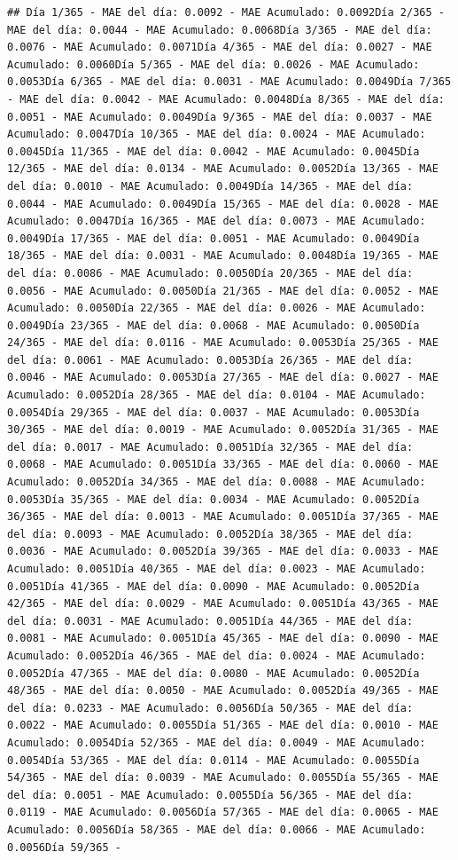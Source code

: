 \documentclass[
]{book}
\begin{document}
\begin{verbatim}
## Día 1/365 - MAE del día: 0.0092 - MAE Acumulado: 0.0092Día 2/365 - MAE del día: 0.0044 - MAE Acumulado: 0.0068Día 3/365 - MAE del día: 0.0076 - MAE Acumulado: 0.0071Día 4/365 - MAE del día: 0.0027 - MAE Acumulado: 0.0060Día 5/365 - MAE del día: 0.0026 - MAE Acumulado: 0.0053Día 6/365 - MAE del día: 0.0031 - MAE Acumulado: 0.0049Día 7/365 - MAE del día: 0.0042 - MAE Acumulado: 0.0048Día 8/365 - MAE del día: 0.0051 - MAE Acumulado: 0.0049Día 9/365 - MAE del día: 0.0037 - MAE Acumulado: 0.0047Día 10/365 - MAE del día: 0.0024 - MAE Acumulado: 0.0045Día 11/365 - MAE del día: 0.0042 - MAE Acumulado: 0.0045Día 12/365 - MAE del día: 0.0134 - MAE Acumulado: 0.0052Día 13/365 - MAE del día: 0.0010 - MAE Acumulado: 0.0049Día 14/365 - MAE del día: 0.0044 - MAE Acumulado: 0.0049Día 15/365 - MAE del día: 0.0028 - MAE Acumulado: 0.0047Día 16/365 - MAE del día: 0.0073 - MAE Acumulado: 0.0049Día 17/365 - MAE del día: 0.0051 - MAE Acumulado: 0.0049Día 18/365 - MAE del día: 0.0031 - MAE Acumulado: 0.0048Día 19/365 - MAE del día: 0.0086 - MAE Acumulado: 0.0050Día 20/365 - MAE del día: 0.0056 - MAE Acumulado: 0.0050Día 21/365 - MAE del día: 0.0052 - MAE Acumulado: 0.0050Día 22/365 - MAE del día: 0.0026 - MAE Acumulado: 0.0049Día 23/365 - MAE del día: 0.0068 - MAE Acumulado: 0.0050Día 24/365 - MAE del día: 0.0116 - MAE Acumulado: 0.0053Día 25/365 - MAE del día: 0.0061 - MAE Acumulado: 0.0053Día 26/365 - MAE del día: 0.0046 - MAE Acumulado: 0.0053Día 27/365 - MAE del día: 0.0027 - MAE Acumulado: 0.0052Día 28/365 - MAE del día: 0.0104 - MAE Acumulado: 0.0054Día 29/365 - MAE del día: 0.0037 - MAE Acumulado: 0.0053Día 30/365 - MAE del día: 0.0019 - MAE Acumulado: 0.0052Día 31/365 - MAE del día: 0.0017 - MAE Acumulado: 0.0051Día 32/365 - MAE del día: 0.0068 - MAE Acumulado: 0.0051Día 33/365 - MAE del día: 0.0060 - MAE Acumulado: 0.0052Día 34/365 - MAE del día: 0.0088 - MAE Acumulado: 0.0053Día 35/365 - MAE del día: 0.0034 - MAE Acumulado: 0.0052Día 36/365 - MAE del día: 0.0013 - MAE Acumulado: 0.0051Día 37/365 - MAE del día: 0.0093 - MAE Acumulado: 0.0052Día 38/365 - MAE del día: 0.0036 - MAE Acumulado: 0.0052Día 39/365 - MAE del día: 0.0033 - MAE Acumulado: 0.0051Día 40/365 - MAE del día: 0.0023 - MAE Acumulado: 0.0051Día 41/365 - MAE del día: 0.0090 - MAE Acumulado: 0.0052Día 42/365 - MAE del día: 0.0029 - MAE Acumulado: 0.0051Día 43/365 - MAE del día: 0.0031 - MAE Acumulado: 0.0051Día 44/365 - MAE del día: 0.0081 - MAE Acumulado: 0.0051Día 45/365 - MAE del día: 0.0090 - MAE Acumulado: 0.0052Día 46/365 - MAE del día: 0.0024 - MAE Acumulado: 0.0052Día 47/365 - MAE del día: 0.0080 - MAE Acumulado: 0.0052Día 48/365 - MAE del día: 0.0050 - MAE Acumulado: 0.0052Día 49/365 - MAE del día: 0.0233 - MAE Acumulado: 0.0056Día 50/365 - MAE del día: 0.0022 - MAE Acumulado: 0.0055Día 51/365 - MAE del día: 0.0010 - MAE Acumulado: 0.0054Día 52/365 - MAE del día: 0.0049 - MAE Acumulado: 0.0054Día 53/365 - MAE del día: 0.0114 - MAE Acumulado: 0.0055Día 54/365 - MAE del día: 0.0039 - MAE Acumulado: 0.0055Día 55/365 - MAE del día: 0.0051 - MAE Acumulado: 0.0055Día 56/365 - MAE del día: 0.0119 - MAE Acumulado: 0.0056Día 57/365 - MAE del día: 0.0065 - MAE Acumulado: 0.0056Día 58/365 - MAE del día: 0.0066 - MAE Acumulado: 0.0056Día 59/365 - 
\end{verbatim}
\end{document}
